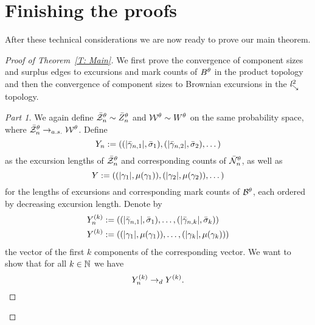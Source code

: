 \newpage

\section{Finishing the proofs} \label{S: proofs}
After these technical considerations we are now ready to prove our main theorem.

\begin{proof}[Proof of Theorem~\ref{T: Main}]
	We first prove the convergence of component sizes and surplus edges to excursions and mark counts of $B^{\theta}$ in the product topology
	and then the convergence of component sizes to Brownian excursions in the $\mathit{l}^2_{\searrow}$ topology.
	
	\begin{proof}[Part 1]\renewcommand{\qedsymbol}{}
	We again define $\bar{\mathcal{Z}}^{\theta}_n \sim \bar{Z}^{\theta}_n$ and $\mathcal{W}^{\theta} \sim W^{\theta}$ on the same probability space,
	where $\bar{\mathcal{Z}}^{\theta}_n \rightarrow_{a.s.} \mathcal{W}^{\theta}$.
	Define
	\begin{equation} \label{E: def Yn}
		Y_n := \left((|\bar{\gamma}_{n,1}|, \bar{\sigma}_1), (|\bar{\gamma}_{n,2}|, \bar{\sigma}_2), \dots\right)
	\end{equation}
	as the excursion lengths of $\bar{\mathcal{Z}}^{\theta}_n$ and corresponding counts of $\bar{\mathcal{N}}_n^{\theta}$,
	as well as
	\begin{equation} \label{E: def Y}
		Y := \left((|\gamma_1|, \mu(\gamma_1)), (|\gamma_2|, \mu(\gamma_2)), \dots\right)
	\end{equation}
	for the lengths of excursions and corresponding mark counts of $\mathcal{B}^{\theta}$, each ordered by decreasing excursion length.
	Denote by 
	\begin{equation} \label{E: def Yk Ynk}
		\begin{aligned}
		Y_n^{(k)} &:= \left((|\bar{\gamma}_{n,1}|, \bar{\sigma}_1), \dots, (|\bar{\gamma}_{n,k}|, \bar{\sigma}_k)\right) \\
		Y^{(k)}  &:= \left((|\gamma_1|, \mu(\gamma_1)), \dots, (|\gamma_k|, \mu(\gamma_k))\right)
		\end{aligned}
	\end{equation}
	the vector of the first $k$ components of the corresponding vector.
	We want to show that for all $k \in \mathbb{N}$ we have
	\begin{equation*}
		Y_n^{(k)} \rightarrow_d Y^{(k)}.
	\end{equation*}
	

\end{proof}
\end{proof}
